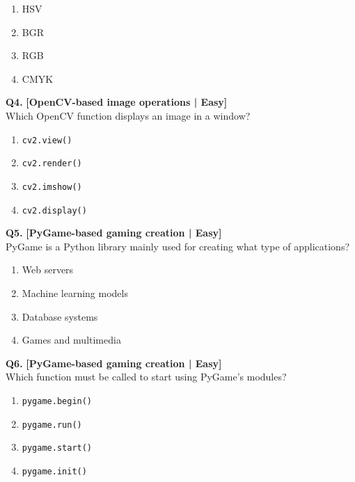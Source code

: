 \begin{enumerate}[label=(\alph*),topsep=2pt,itemsep=1pt,partopsep=0pt,parsep=0pt]
    \item \relax HSV
    \item \relax BGR
    \item \relax RGB
    \item \relax CMYK
\end{enumerate}
\vspace{2mm}

\noindent\textbf{Q4.} \hfill {\small\color{LPUOrange}\textbf{[OpenCV-based image operations | Easy]}}\\[2pt]
Which OpenCV function displays an image in a window?

\begin{enumerate}[label=(\alph*),topsep=2pt,itemsep=1pt,partopsep=0pt,parsep=0pt]
    \item \relax \texttt{cv2.view()}
    \item \relax \texttt{cv2.render()}
    \item \relax \texttt{cv2.imshow()}
    \item \relax \texttt{cv2.display()}
\end{enumerate}
\vspace{2mm}

\noindent\textbf{Q5.} \hfill {\small\color{LPUOrange}\textbf{[PyGame-based gaming creation | Easy]}}\\[2pt]
PyGame is a Python library mainly used for creating what type of applications?

\begin{enumerate}[label=(\alph*),topsep=2pt,itemsep=1pt,partopsep=0pt,parsep=0pt]
    \item \relax Web servers
    \item \relax Machine learning models
    \item \relax Database systems
    \item \relax Games and multimedia
\end{enumerate}
\vspace{2mm}

\noindent\textbf{Q6.} \hfill {\small\color{LPUOrange}\textbf{[PyGame-based gaming creation | Easy]}}\\[2pt]
Which function must be called to start using PyGame's modules?

\begin{enumerate}[label=(\alph*),topsep=2pt,itemsep=1pt,partopsep=0pt,parsep=0pt]
    \item \relax \texttt{pygame.begin()}
    \item \relax \texttt{pygame.run()}
    \item \relax \texttt{pygame.start()}
    \item \relax \texttt{pygame.init()}
\end{enumerate}
\vspace{2mm}

